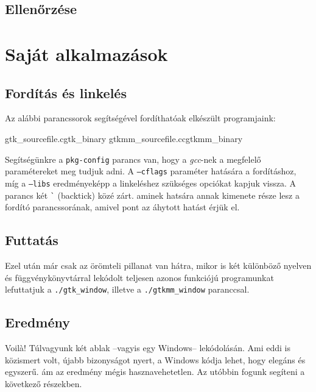 \subsection{Ellenőrzése}

\section{Saját alkalmazások}

\subsection{Fordítás és linkelés}
\label{sec:compilingandlinking}

Az alábbi parancssorok segítségével fordíthatóak elkészült programjaink:

\lstcompiles
{gtk\_sourcefile.c}{gtk\_binary}
{gtkmm\_sourcefile.cc}{gtkmm\_binary}

Segítségünkre a \texttt{pkg-config} parancs van, hogy a \textit{gcc}-nek a megfelelő paramétereket meg tudjuk adni. A \texttt{--cflags} paraméter hatására a fordításhoz, míg a \texttt{--libs} eredményeképp a linkeléshez szükséges opciókat kapjuk vissza. A parancs két \texttt{\`} (backtick) közé zárt. aminek hatsára annak kimenete része lesz a fordító parancssorának, amivel pont az áhytott hatást érjük el.

\subsection{Futtatás}

Ezel után már csak az örömteli pillanat van hátra, mikor is két különböző nyelven és függvénykönyvtárral lekódolt teljesen azonos funkciójú programunkat lefuttatjuk a \texttt{./gtk\_window}, illetve a \texttt{./gtkmm\_window} paranccsal.

\subsection{Eredmény}

Voil\`{a}! Túlvagyunk két ablak --vagyis egy Windows-- lekódolásán. Ami eddi is közismert volt, újabb bizonyságot nyert, a Windows kódja lehet, hogy elegáns és egyszerű. ám az eredmény mégis hasznavehetetlen. Az utóbbin fogunk segíteni a következő részekben.
